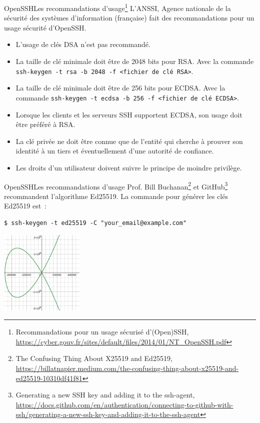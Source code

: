 \documentclass{beamer}
\begin{document}
    \begin{frame}{OpenSSH}{Les recommandations d'usage\footnote{\label{openssh-anssi}Recommandations pour un usage sécurisé d’(Open)SSH, \url{https://cyber.gouv.fr/sites/default/files/2014/01/NT_OpenSSH.pdf}}}
        L'ANSSI, Agence nationale de la sécurité des systèmes d’information (française) fait des recommandations pour un usage sécurité d'OpenSSH.
        \bigbreak
        \begin{itemize}
            \item L’usage de clés DSA n’est pas recommandé.
            \item La taille de clé minimale doit être de 2048 bits pour RSA.
            Avec la commande \lstinline{ssh-keygen -t rsa -b 2048 -f <fichier de clé RSA>}.
            \item La taille de clé minimale doit être de 256 bits pour ECDSA.
            Avec la commande \lstinline{ssh-keygen -t ecdsa -b 256 -f <fichier de clé ECDSA>}.
            \item Lorsque les clients et les serveurs SSH supportent ECDSA, son usage doit être préféré à RSA.
            \item La clé privée ne doit être connue que de l’entité qui cherche à prouver son identité à un tiers et éventuellement d’une autorité de confiance.
            \item Les droits d’un utilisateur doivent suivre le principe de moindre privilège.
        \end{itemize}
    \end{frame}

    \begin{frame}[fragile]{OpenSSH}{Les recommandations d'usage}
        Prof. Bill Buchanan\footnote{The Confusing Thing About X25519 and Ed25519, \url{https://billatnapier.medium.com/the-confusing-thing-about-x25519-and-ed25519-10310df41f81}} et GitHub\footnote{Generating a new SSH key and adding it to the ssh-agent, \url{https://docs.github.com/en/authentication/connecting-to-github-with-ssh/generating-a-new-ssh-key-and-adding-it-to-the-ssh-agent}} recommandent l'algorithme Ed25519.
        \bigbreak
        La commande pour générer les clés Ed25519 est~:
        \begin{lstlisting}
$ ssh-keygen -t ed25519 -C "your_email@example.com"
        \end{lstlisting}
        \begin{center}
            \includegraphics[width=4cm]{image/Ed25519-curve}
        \end{center}
    \end{frame}
\end{document}
